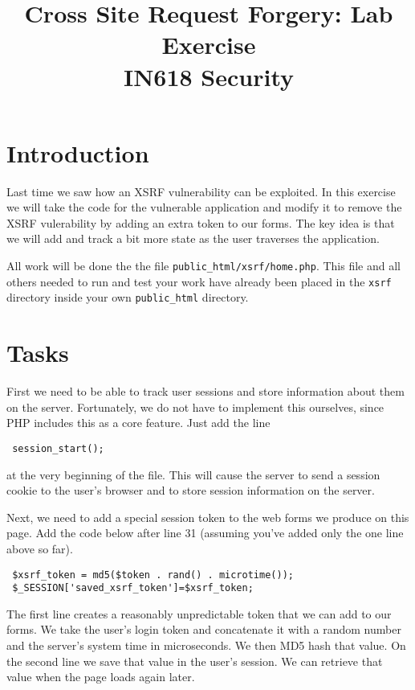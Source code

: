 \documentclass{article}
\begin{document}
\title{Cross Site Request Forgery: Lab Exercise\\ IN618 Security}
\date{}
\maketitle

\section*{Introduction}
Last time we saw how an XSRF vulnerability can be exploited.  In this exercise we will
take the code for the vulnerable application and modify it to remove the XSRF vulerability
by adding an extra token to our forms. The key idea is that we will add and track a bit more
state as the user traverses the application.

All work will be done the the file \texttt{public\_html/xsrf/home.php}.  This file
and all others needed to run and test your work have already been placed in the \texttt{xsrf}
directory inside your own \texttt{public\_html} directory.

\section{Tasks}
First we need to be able to track user sessions and store information about them on the server.
Fortunately, we do not have to implement this ourselves, since PHP includes this as a core feature.
Just add the line

\texttt{ session\_start(); } 

at the very beginning of the file. This will cause the server to send a session cookie
to the user's browser and to store session information on the server.

Next, we need to add a special session token to the web forms we produce on this page. Add the
code below after line 31 (assuming you've added only the one line above so far).

\begin{verbatim}
 $xsrf_token = md5($token . rand() . microtime());
 $_SESSION['saved_xsrf_token']=$xsrf_token;
\end{verbatim}

The first line creates a reasonably unpredictable token that we can add to our forms.  We
take the user's login token and concatenate it with a random number and the server's system
time in microseconds.  We then MD5 hash that value.  On the second line we save that value in
the user's session.  We can retrieve that value when the page loads again later.
\end{document}
